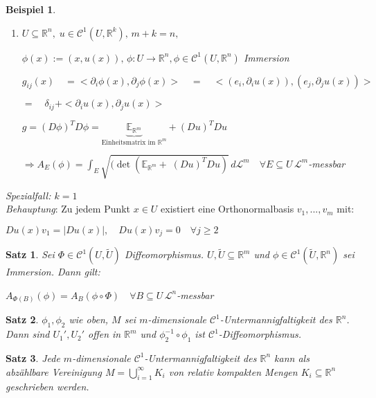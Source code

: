 \documentclass[11pt]{memoir}
\theoremstyle{changebreak}
\newtheorem{Beispiel}{Beispiel}[chapter]
\newtheorem{Satz}{Satz}[chapter]
\begin{document}
\begin{Beispiel}
\begin{enumerate}
	\item $U \subseteq \mathbb R^n, \;u \in \mathscr C^1(U, \mathbb R^k), \, m+k =n,$
	\par
	$ \phi(x) := (x, u(x)), \, \phi: U \rightarrow \mathbb R^n, \phi \in \mathscr C^1(U, \mathbb R^n)$ Immersion
	\par
	$g_{ij}(x) \quad = <\partial_i \phi(x), \partial_j \phi(x)> \quad=\quad <(e_i, \partial_i u(x)), (e_j, \partial_j u(x))> \quad$
	\par
	$= \quad \delta_{ij} + <\partial_i u(x), \partial_j u(x)> $
	\par
	$g = (D\phi)^T D\phi = \underbrace{\mathbb E_{\mathbb R^m}}_{\text{Einheitsmatrix im }\mathbb R^m} + (Du)^TDu$  \\%
	\par\bigskip
	$\Rightarrow A_E(\phi) = \int_E \sqrt{(\det(\mathbb E_{\mathbb R^m} +\; (Du)^TDu)}\,d\mathscr L^m \quad \forall E \subseteq U\, \mathscr L^m$-messbar
\end{enumerate}
\end{Beispiel}

\par\bigskip
\emph{Spezialfall: $k=1$} \\
\emph{Behauptung}: Zu jedem Punkt $x \in U$ existiert eine Orthonormalbasis $v_1, ... , v_m$ mit:
\begin{center}
	$Du(x) v_1 = |Du(x)|, \quad Du(x) v_j = 0\quad \forall j \geq 2$
\end{center}


\begin{Satz}
Sei $\Phi \in \mathscr C^1(U, \tilde U)$ Diffeomorphismus. $U, \tilde U \subseteq \mathbb R^m$ und $\phi \in \mathscr C^1(\tilde U, \mathbb R^n)$ sei Immersion. Dann gilt:
\begin{center}
	$A_{\Phi(B)}(\phi) = A_B (\phi \circ \Phi) \quad \forall B \subseteq U \, \mathscr L^n$-messbar
\end{center}
\end{Satz}

\begin{Satz}
$\phi_1, \phi_2$ wie oben, $M$ sei $m$-dimensionale $\mathscr C^1$-Untermannigfaltigkeit des $\mathbb R^n$. Dann sind $U_1 ', U_2 '$ offen in $\mathbb R^m$ und $\phi_2^{-1}\circ \phi_1$ ist $\mathscr C^1$-Diffeomorphismus.
\end{Satz}

\begin{Satz}
Jede $m$-dimensionale $\mathscr C^1$-Untermannigfaltigkeit des $\mathbb R^n$ kann als abzählbare Vereinigung $M = \bigcup\limits_{i=1}^\infty K_i$ von relativ kompakten Mengen $K_i \subseteq \mathbb R^n$ geschrieben werden.
\end{Satz}
\end{document}
